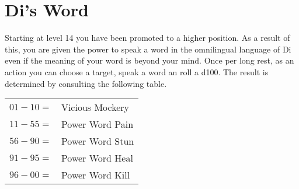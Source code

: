 \documentclass[11pt, A4paper, english]{article}
\begin{document}
	\section*{Di's Word}
Starting at level 14 you have been promoted to a higher position. As a result of this, you are given the power to speak a word in the omnilingual language of Di even if the meaning of your word is beyond your mind. Once per long rest, as an action you can choose a target, speak a word an roll a d100. The result is determined by consulting the following table. \\
		\begin{tabular}{ll}
$01 - 10 =$ & Vicious Mockery \\
$11 - 55 =$ & Power Word Pain \\
$56 - 90 =$ & Power Word Stun \\
$91 - 95 =$ & Power Word Heal \\
$96 - 00 =$ & Power Word Kill
		\end{tabular}
\end{document}
